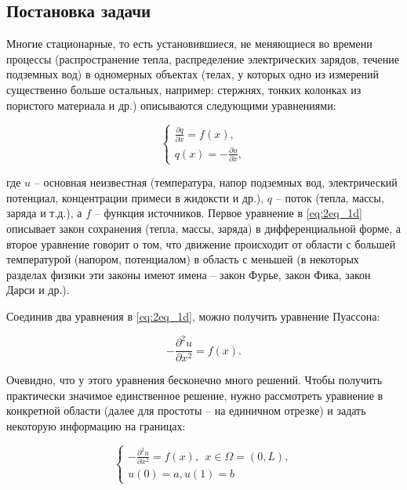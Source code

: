 \documentclass[a4paper, 11pt]{article}
\begin{document}
\subsection{Постановка задачи}

Многие стационарные, то есть установившиеся, не меняющиеся во времени процессы (распространение тепла, распределение электрических зарядов, течение подземных вод) в одномерных объектах (телах, у которых одно из измерений существенно больше остальных, например: стержнях, тонких колонках из пористого материала и др.) описываются следующими уравнениями:

\begin{equation}\label{eq:2eq_1d}
	\begin{cases}
		\frac{\partial q}{\partial x} = f(x),\\
		q(x) = -\frac{\partial u}{\partial x},
	\end{cases}
\end{equation}

где $u$ -- основная неизвестная (температура, напор подземных вод, электрический потенциал, концентрации примеси в жидоксти и др.), $q$ --  поток (тепла, массы, заряда и т.д.), а $f$ -- функция источников. Первое уравнение в \eqref{eq:2eq_1d} описывает закон сохранения (тепла, массы, заряда) в дифференциальной форме, а второе уравнение говорит о том, что движение происходит от области с большей температурой (напором, потенциалом) в область с меньшей (в некоторых разделах физики эти законы имеют имена -- закон Фурье, закон Фика, закон Дарси и др.).

Соединив два уравнения в \eqref{eq:2eq_1d}, можно получить уравнение Пуассона:

\begin{equation}
	-\frac{\partial^2 u}{\partial x^2} = f(x).
\end{equation}

Очевидно, что у этого уравнения бесконечно много решений. Чтобы получить практически значимое единственное решение, нужно рассмотреть уравнение в конкретной области (далее для простоты -- на единичном отрезке) и задать некоторую информацию на границах:

\begin{equation}\label{eq:poisson_bvp_dir_1d}
	\begin{cases}
		-\frac{\partial^2 u}{\partial x^2} = f(x),~~x\in\Omega = (0,L),\\
		u(0) = a, u(1) = b
	\end{cases}
\end{equation}
\end{document}
